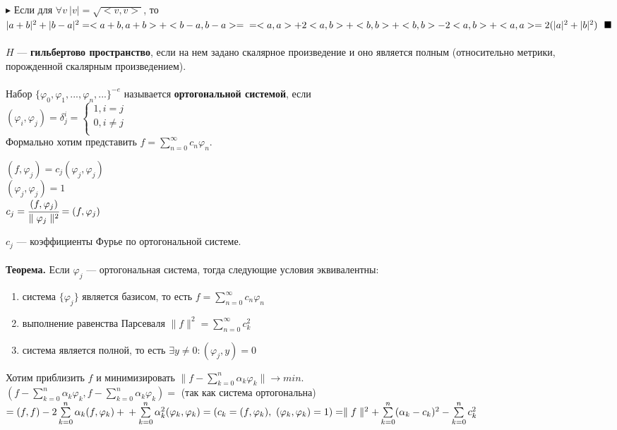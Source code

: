 \documentclass[a4paper,12pt]{article}
\begin{document}
\begin{defintion}
$\blacktriangleright $ Если для $\forall v ~|v| = \sqrt{<v, v>}$, то $|a+b|^2+|b-a|^2 = <a+b, a+b> + <b-a, b-a> = \\=<a, a> + 2<a, b> + <b, b> +<b, b> - 2<a, b> + <a, a> = 2(|a|^2 + |b|^2)~~ \blacksquare$\\
\\
$H$ --- \textbf{гильбертово пространство}, если на нем задано скалярное произведение и оно является полным (относительно метрики, порожденной скалярным произведением).\\
\\
Набор $\{ \varphi_0, \varphi_1,...,\varphi_n,...\}^{-e}$ называется \textbf{ортогональной системой}, если \\$(\varphi_i, \varphi_j) = \delta_j^i = 
\left\{  
\begin{array}{lcl}  
1, i = j \\  
0, i \neq j \\
\end{array}   
\right.  
$\\
Формально хотим представить $f = \sum\limits_{n=0}^{\infty} c_n \varphi_n$.\begin{center}
	$(f, \varphi_j) = c_j(\varphi_j, \varphi_j)$\\ 
	$(\varphi_j, \varphi_j) = 1$\\ 
	$c_j = \cfrac{(f, \varphi_j)}{\parallel \varphi_j \parallel^2} = (f, \varphi_j)$\end{center} $c_j$ --- коэффициенты Фурье по ортогональной системе.\\ \\
\textbf{Теорема.}
Если $\varphi_j$ --- ортогональная система, тогда следующие условия эквивалентны:\begin{enumerate}
	\item система $\{\varphi_j\}$ является базисом, то есть $f = \sum\limits_{n=0}^{\infty}c_n \varphi_n$
	\item выполнение равенства Парсеваля $\parallel f \parallel^2 = \sum\limits_{n=0}^{\infty}c_k^2$
	\item система является полной, то есть $\exists y \neq 0: (\varphi_j, y) = 0$
\end{enumerate}
Хотим приблизить $f$ и минимизировать $\parallel f - \sum\limits_{k=0}^n \alpha_k \varphi_k \parallel \to min$.\\
$(f - \sum\limits_{k=0}^n \alpha_k \varphi_k, f - \sum\limits_{k=0}^n \alpha_k \varphi_k) =$ (так как система ортогональна) $= (f, f) - 2\sum\limits_{k=0}^n \alpha_k (f, \varphi_k) +\\+\sum\limits_{k=0}^n \alpha_k^2 (\varphi_k, \varphi_k) = (c_k=(f, \varphi_k),~ (\varphi_k, \varphi_k)=1) = \parallel f \parallel^2 + \sum\limits_{k=0}^n (\alpha_k - c_k)^2 - \sum\limits_{k=0}^n c_k^2$\\

\end{defintion}
\end{document}
